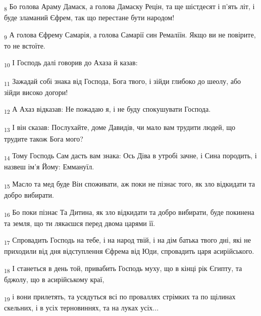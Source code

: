 \begin{tcolorbox}
\textsubscript{8} Бо голова Араму Дамаск, а голова Дамаску Рецін, та ще шістдесят і п'ять літ, і буде зламаний Єфрем, так що перестане бути народом!
\end{tcolorbox}
\begin{tcolorbox}
\textsubscript{9} А голова Єфрему Самарія, а голова Самарії син Ремаліїн. Якщо ви не повірите, то не встоїте.
\end{tcolorbox}
\begin{tcolorbox}
\textsubscript{10} І Господь далі говорив до Ахаза й казав:
\end{tcolorbox}
\begin{tcolorbox}
\textsubscript{11} Зажадай собі знака від Господа, Бога твого, і зійди глибоко до шеолу, або зійди високо догори!
\end{tcolorbox}
\begin{tcolorbox}
\textsubscript{12} А Ахаз відказав: Не пожадаю я, і не буду спокушувати Господа.
\end{tcolorbox}
\begin{tcolorbox}
\textsubscript{13} І він сказав: Послухайте, доме Давидів, чи мало вам трудити людей, що трудите також Бога мого?
\end{tcolorbox}
\begin{tcolorbox}
\textsubscript{14} Тому Господь Сам дасть вам знака: Ось Діва в утробі зачне, і Сина породить, і назвеш ім'я Йому: Еммануїл.
\end{tcolorbox}
\begin{tcolorbox}
\textsubscript{15} Масло та мед буде Він споживати, аж поки не пізнає того, як зло відкидати та добро вибирати.
\end{tcolorbox}
\begin{tcolorbox}
\textsubscript{16} Бо поки пізнає Та Дитина, як зло відкидати та добро вибирати, буде покинена та земля, що ти лякаєшся перед двома царями її.
\end{tcolorbox}
\begin{tcolorbox}
\textsubscript{17} Спровадить Господь на тебе, і на народ твій, і на дім батька твого дні, які не приходили від дня відступлення Єфрема від Юди, спровадить царя асирійського.
\end{tcolorbox}
\begin{tcolorbox}
\textsubscript{18} І станеться в день той, привабить Господь муху, що в кінці рік Єгипту, та бджолу, що в асирійському краї,
\end{tcolorbox}
\begin{tcolorbox}
\textsubscript{19} і вони прилетять, та усядуться всі по проваллях стрімких та по щілинах скельних, і в усіх терновиннях, та на луках усіх...
\end{tcolorbox}
